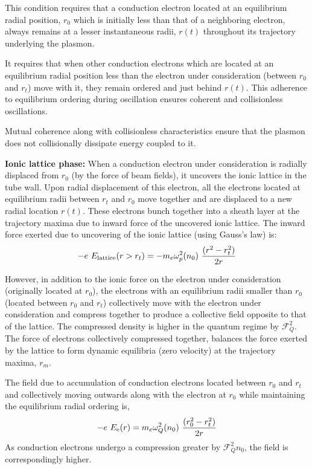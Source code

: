 \documentclass[aps,twocolumn,notitlepage,superscriptaddress]{revtex4-1}
\begin{document}
This condition requires that a conduction electron located at an equilibrium radial position, $r_0$ which is initially less than that of a neighboring electron, always remains at a lesser instantaneous radii, $r(t)$ throughout its trajectory underlying the plasmon. 

It requires that when other conduction electrons which are located at an equilibrium radial position less than the electron under consideration (between $r_0$ and $r_t$) move with it, they remain ordered and just behind $r(t)$. This adherence to equilibrium ordering during oscillation ensures coherent and collisionless oscillations.

Mutual coherence along with collisionless characteristics ensure that the plasmon does not collisionally dissipate energy coupled to it.

{\bf Ionic lattice phase:} When a conduction electron under consideration is radially displaced from $r_0$ (by the force of beam fields), it uncovers the ionic lattice in the tube wall. Upon radial displacement of this electron, all the electrons located at equilibrium radii between $r_t$ and $r_0$ move together and are displaced to a new radial location $r(t)$. These electrons bunch together into a sheath layer at the trajectory maxima due to inward force of the uncovered ionic lattice. The inward force exerted due to uncovering of the ionic lattice (using Gauss's law) is:
\begin{align}\label{eq:ionic-force-r}
\begin{split}
-e ~ E_{\rm lattice}(r > r_t) = - m_e \omega_{p}^2(n_0) ~ \frac{(r^2 - r_t^2)}{2r}
\end{split}
\end{align}

However, in addition to the ionic force on the electron under consideration (originally located at $r_0$), the electrons with an equilibrium radii smaller than $r_0$ (located between $r_0$ and $r_t$) collectively move with the electron under consideration and compress together to produce a collective field opposite to that of the lattice. The compressed density is higher in the quantum regime by $\mathscr{F}_Q^2$. The force of electrons collectively compressed together, balances the force exerted by the lattice to form dynamic equilibria (zero velocity) at the trajectory maxima, $r_m$. 

The field due to accumulation of conduction electrons located between $r_0$ and $r_t$ and collectively moving outwards along with the electron at $r_0$ while maintaining the equilibrium radial ordering is,
\begin{align}\label{eq:electronic-force-r}
\begin{split}
-e ~ E_{\rm e}(r) = m_e\omega_{Q}^2(n_0) ~ \frac{(r_0^2 - r_t^2)}{2r}
\end{split}
\end{align}
As conduction electrons undergo a compression greater by $\mathscr{F}_Q^2n_0$, the field is correspondingly higher.
\end{document}
